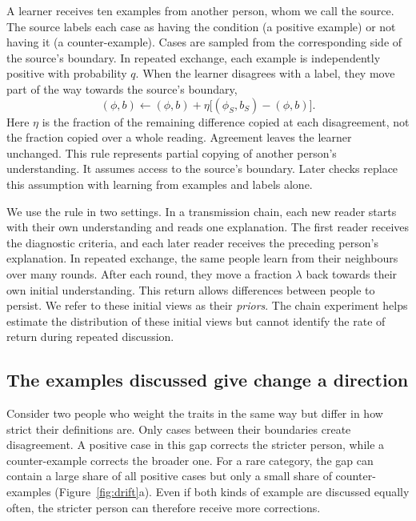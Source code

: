 \documentclass[11pt]{article}
\begin{document}
A learner receives ten examples from another person, whom we call the source. The source labels each case as having the condition (a positive example) or not having it (a counter-example). Cases are sampled from the corresponding side of the source's boundary. In repeated exchange, each example is independently positive with probability $q$. When the learner disagrees with a label, they move part of the way towards the source's boundary,
\begin{equation}
(\phi,b)\leftarrow(\phi,b)+\eta\bigl[(\phi_S,b_S)-(\phi,b)\bigr].
\label{eq:update}
\end{equation}
Here $\eta$ is the fraction of the remaining difference copied at each disagreement, not the fraction copied over a whole reading. Agreement leaves the learner unchanged. This rule represents partial copying of another person's understanding. It assumes access to the source's boundary. Later checks replace this assumption with learning from examples and labels alone.

We use the rule in two settings. In a transmission chain, each new reader starts with their own understanding and reads one explanation. The first reader receives the diagnostic criteria, and each later reader receives the preceding person's explanation. In repeated exchange, the same people learn from their neighbours over many rounds. After each round, they move a fraction $\lambda$ back towards their own initial understanding. This return allows differences between people to persist. We refer to these initial views as their \emph{priors}. The chain experiment helps estimate the distribution of these initial views but cannot identify the rate of return during repeated discussion.

\subsection{The examples discussed give change a direction}
\label{sec:drift}

Consider two people who weight the traits in the same way but differ in how strict their definitions are. Only cases between their boundaries create disagreement. A positive case in this gap corrects the stricter person, while a counter-example corrects the broader one. For a rare category, the gap can contain a large share of all positive cases but only a small share of counter-examples (Figure~\ref{fig:drift}a). Even if both kinds of example are discussed equally often, the stricter person can therefore receive more corrections.
\end{document}
